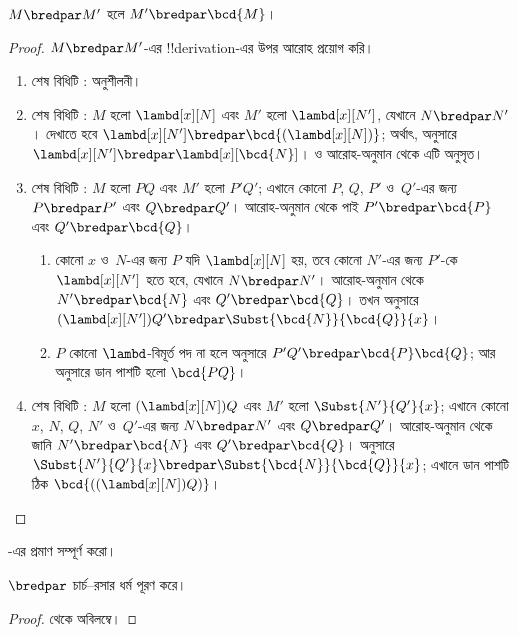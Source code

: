 \documentclass[../../../include/open-logic-section]{subfiles}
\begin{document}
\begin{lem}
  $M \bredpar M'$ হলে $M' \bredpar \bcd{M}$।
\end{lem}
\begin{proof}
  $M \bredpar M'$-এর !!{derivation}-এর উপর আরোহ প্রয়োগ করি।
  \begin{enumerate}
    \item শেষ বিধিটি : অনুশীলনী।
    \item শেষ বিধিটি : $M$ হলো
      $\lambd[x][N]$ এবং $M'$ হলো $\lambd[x][N']$, যেখানে
      $N \bredpar N'$। দেখাতে হবে $\lambd[x][N'] \bredpar
      \bcd{(\lambd[x][N])}$; অর্থাৎ,  অনুসারে
      $\lambd[x][N'] \bredpar \lambd[x][\bcd{N}]$।
       ও আরোহ-অনুমান থেকে এটি অনুসৃত।
    \item শেষ বিধিটি : $M$ হলো $PQ$ এবং $M'$
      হলো $P'Q'$; এখানে কোনো $P$, $Q$, $P'$ ও~$Q'$-এর জন্য
      $P \bredpar P'$ এবং $Q \bredpar Q'$। আরোহ-অনুমান থেকে পাই
      $P' \bredpar \bcd{P}$ এবং $Q' \bredpar \bcd{Q}$।
      \begin{enumerate}
        \item কোনো $x$ ও~$N$-এর জন্য $P$ যদি $\lambd[x][N]$ হয়,
          তবে কোনো $N'$-এর জন্য $P'$-কে $\lambd[x][N']$ হতে হবে,
          যেখানে $N \bredpar N'$। আরোহ-অনুমান থেকে
          $N' \bredpar \bcd{N}$ এবং $Q' \bredpar \bcd{Q}$। তখন
           অনুসারে $(\lambd[x][N'])Q' \bredpar
          \Subst{\bcd{N}}{\bcd{Q}}{x}$।
        \item $P$ কোনো $\lambd$-বিমূর্ত পদ না হলে
           অনুসারে $P'Q' \bredpar
          \bcd{P}\bcd{Q}$; আর  অনুসারে ডান পাশটি
          হলো $\bcd{PQ}$।
      \end{enumerate}
    \item শেষ বিধিটি : $M$ হলো
      $(\lambd[x][N])Q$ এবং $M'$ হলো $\Subst{N'}{Q'}{x}$; এখানে
      কোনো $x$, $N$, $Q$, $N'$ ও~$Q'$-এর জন্য $N \bredpar N'$ এবং
      $Q \bredpar Q'$। আরোহ-অনুমান থেকে জানি
      $N' \bredpar \bcd{N}$ এবং $Q' \bredpar \bcd{Q}$।
       অনুসারে
      $\Subst{N'}{Q'}{x} \bredpar \Subst{\bcd{N}}{\bcd{Q}}{x}$;
      এখানে ডান পাশটি ঠিক $\bcd{((\lambd[x][N])Q)}$।
  \end{enumerate}
\end{proof}

\begin{prob}
  -এর প্রমাণ সম্পূর্ণ করো।
\end{prob}

\begin{thm}
  $\bredpar$ চার্চ--রসার ধর্ম পূরণ করে।
\end{thm}

\begin{proof}
   থেকে অবিলম্বে।
\end{proof}
\end{document}
